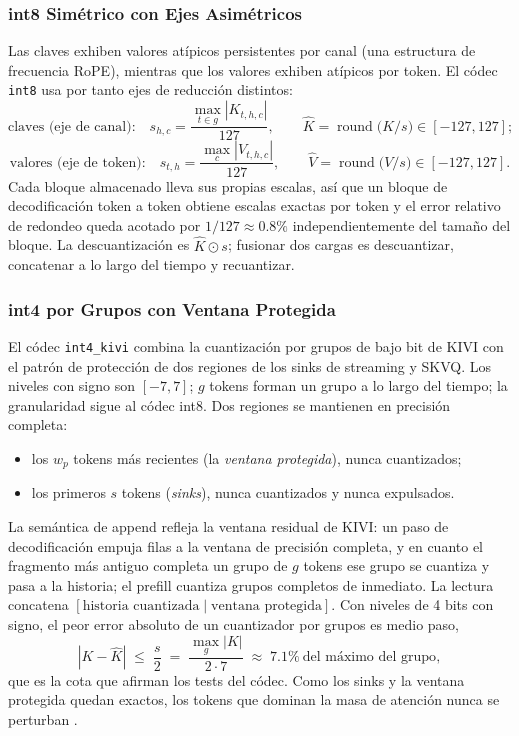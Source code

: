\subsubsection{int8 Simétrico con Ejes Asimétricos}

Las claves exhiben valores atípicos persistentes por canal (una estructura de frecuencia RoPE), mientras que los valores exhiben atípicos por token. El códec \texttt{int8} usa por tanto ejes de reducción distintos:
\[
\text{claves (eje de canal):}\quad s_{h,c} = \frac{\max_{t\in g}|K_{t,h,c}|}{127},\qquad \hat{K} = \operatorname{round}\!\big(K/s\big)\in[-127,127];
\]
\[
\text{valores (eje de token):}\quad s_{t,h} = \frac{\max_{c}|V_{t,h,c}|}{127},\qquad \hat{V} = \operatorname{round}\!\big(V/s\big)\in[-127,127].
\]
Cada bloque almacenado lleva sus propias escalas, así que un bloque de decodificación token a token obtiene escalas exactas por token y el error relativo de redondeo queda acotado por $1/127\approx 0.8\%$ independientemente del tamaño del bloque. La descuantización es $\hat{K}\odot s$; fusionar dos cargas es descuantizar, concatenar a lo largo del tiempo y recuantizar.

\subsubsection{int4 por Grupos con Ventana Protegida}

El códec \texttt{int4\_kivi} combina la cuantización por grupos de bajo bit de KIVI con el patrón de protección de dos regiones de los sinks de streaming y SKVQ. Los niveles con signo son $[-7,7]$; $g$ tokens forman un grupo a lo largo del tiempo; la granularidad sigue al códec int8. Dos regiones se mantienen en precisión completa:
\begin{itemize}[leftmargin=*]
    \item los $w_p$ tokens más recientes (la \emph{ventana protegida}), nunca cuantizados;
    \item los primeros $s$ tokens (\emph{sinks}), nunca cuantizados y nunca expulsados.
\end{itemize}
La semántica de append refleja la ventana residual de KIVI: un paso de decodificación empuja filas a la ventana de precisión completa, y en cuanto el fragmento más antiguo completa un grupo de $g$ tokens ese grupo se cuantiza y pasa a la historia; el prefill cuantiza grupos completos de inmediato. La lectura concatena $[\text{historia cuantizada}\mid\text{ventana protegida}]$. Con niveles de 4 bits con signo, el peor error absoluto de un cuantizador por grupos es medio paso,
\[
|K-\hat{K}| \;\le\; \frac{s}{2} \;=\; \frac{\max_{g}|K|}{2\cdot 7} \;\approx\; 7.1\%\ \text{del máximo del grupo},
\]
que es la cota que afirman los tests del códec. Como los sinks y la ventana protegida quedan exactos, los tokens que dominan la masa de atención nunca se perturban \citep{kivi_liu_2024,kvquant_hooper_2024,skvq_duanmu_2024,xiao_streaming_sinks_2024}.

